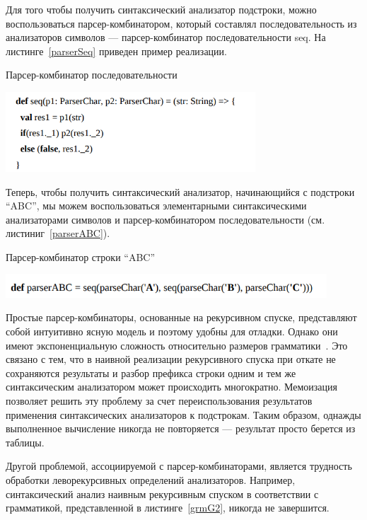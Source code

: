 Для того чтобы получить синтаксический анализатор подстроки, можно воспользоваться парсер-комбинатором,
который составлял последовательность из анализаторов символов --- парсер-комбинатор последовательности seq. На листинге~\ref{parserSeq} приведен пример реализации.

\begin{listing}
\caption{Парсер-комбинатор последовательности}
\label{parserSeq}
\centering
\includegraphics[width=0.7\textwidth]{Smolina/pics/parserSeq.png}
\end{listing}

Теперь, чтобы получить синтаксический анализатор, начинающийся с подстроки ``ABC'', мы можем воспользоваться элементарными синтаксическими анализаторами символов и парсер-комбинатором последовательности (см. листиниг~\ref{parserABC}).

\begin{listing}
\caption{Парсер-комбинатор строки “ABC”}
\label{parserABC}
\centering
\includegraphics[width=0.9\textwidth]{Smolina/pics/parserABC.png}
\end{listing}

Простые парсер-комбинаторы, основанные на рекурсивном спуске, представляют собой интуитивно ясную модель и поэтому удобны для
отладки. Однако они имеют экспоненциальную сложность относительно размеров грамматики~\cite{Popov}. Это связано с тем, что в наивной реализации рекурсивного спуска при откате не сохраняются результаты и разбор префикса строки одним и тем же синтаксическим анализатором может происходить многократно. Мемоизация~\cite{Memoization} позволяет решить эту проблему за счет переиспользования результатов применения синтаксических анализаторов к подстрокам. Таким образом, однажды выполненное вычисление никогда не повторяется --- результат просто берется из таблицы.

Другой проблемой, ассоциируемой с парсер-комбинаторами, является трудность обработки леворекурсивных определений анализаторов. Например, синтаксический анализ наивным рекурсивным спуском в соответствии с грамматикой, представленной в листинге~\ref{grmG2}, никогда не завершится.

